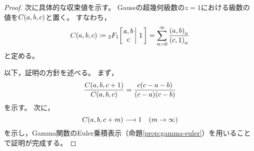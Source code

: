 \documentclass[a4paper,draft]{ltjsarticle}
\begin{document}
\begin{thm}[Kummerの関係]
\begin{proof}
        次に具体的な収束値を示す。
        Gaussの超幾何級数の$z=1$における級数の値を$\fun{C}{a,b,c}$と置く。
        すなわち，
        \begin{equation}
            \fun{C}{a,b,c}\coloneqq \Gauss{a}{b}{c}{1}
            =\sum_{n=0}^\infty \frac{\poch{a,b}{n}}{\poch{c,1}{n}}
        \end{equation}
        と定める。

        以下，証明の方針を述べる。
        まず，
        \begin{equation}
            \frac{\fun{C}{a,b,c+1}}{\fun{C}{a,b,c}}=\frac{c\pare{c-a-b}}{\pare{c-a}\pare{c-b}}
            \label{eq:gauss-C/C}
        \end{equation}
        を示す。
        次に，
        \begin{equation}
            \fun{C}{a,b,c+m}\longrightarrow 1\quad \pare{m\to\infty}
        \end{equation}
        を示し，Gamma関数のEuler乗積表示（命題\ref{prop:gamma-euler}）を用いることで証明が完成する。


\end{proof}
\end{thm}
\end{document}
